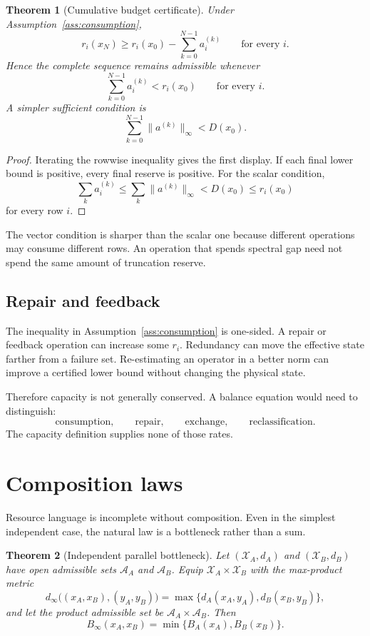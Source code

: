 \documentclass[11pt]{article}
\newtheorem{theorem}{Theorem}[section]
\theoremstyle{definition}
\theoremstyle{remark}
\newcommand{\cA}{\mathcal A}
\newcommand{\cX}{\mathcal X}
\begin{document}
\begin{theorem}[Cumulative budget certificate]
\label{thm:cumulative}
Under Assumption~\ref{ass:consumption},
\[
 r_i(x_N)
 \ge
 r_i(x_0)-\sum_{k=0}^{N-1}a_i^{(k)}
 \qquad
 \text{for every }i.
\]
Hence the complete sequence remains admissible whenever
\[
 \sum_{k=0}^{N-1}a_i^{(k)}<r_i(x_0)
 \qquad
 \text{for every }i.
\]
A simpler sufficient condition is
\[
 \sum_{k=0}^{N-1}\|a^{(k)}\|_\infty<D(x_0).
\]
\end{theorem}

\begin{proof}
Iterating the rowwise inequality gives the first display.  If each final
lower bound is positive, every final reserve is positive.  For the scalar
condition,
\[
 \sum_k a_i^{(k)}
 \le
 \sum_k\|a^{(k)}\|_\infty
 <
 D(x_0)
 \le r_i(x_0)
\]
for every row \(i\).
\end{proof}

The vector condition is sharper than the scalar one because different
operations may consume different rows.  An operation that spends spectral
gap need not spend the same amount of truncation reserve.

\subsection{Repair and feedback}

The inequality in Assumption~\ref{ass:consumption} is one-sided.  A repair
or feedback operation can increase some \(r_i\).  Redundancy can move the
effective state farther from a failure set.  Re-estimating an operator in a
better norm can improve a certified lower bound without changing the
physical state.

Therefore capacity is not generally conserved.  A balance equation would
need to distinguish:
\[
 \text{consumption},\qquad
 \text{repair},\qquad
 \text{exchange},\qquad
 \text{reclassification}.
\]
The capacity definition supplies none of those rates.

\section{Composition laws}
\label{sec:composition}

Resource language is incomplete without composition.  Even in the simplest
independent case, the natural law is a bottleneck rather than a sum.

\begin{theorem}[Independent parallel bottleneck]
\label{thm:parallel}
Let \((\cX_A,d_A)\) and \((\cX_B,d_B)\) have open admissible sets
\(\cA_A\) and \(\cA_B\).  Equip
\(\cX_A\times\cX_B\) with the max-product metric
\[
 d_\infty\bigl((x_A,x_B),(y_A,y_B)\bigr)
 =
 \max\{d_A(x_A,y_A),d_B(x_B,y_B)\},
\]
and let the product admissible set be
\(\cA_A\times\cA_B\).  Then
\[
 B_\infty(x_A,x_B)
 =
 \min\{B_A(x_A),B_B(x_B)\}.
\]
\end{theorem}
\end{document}
